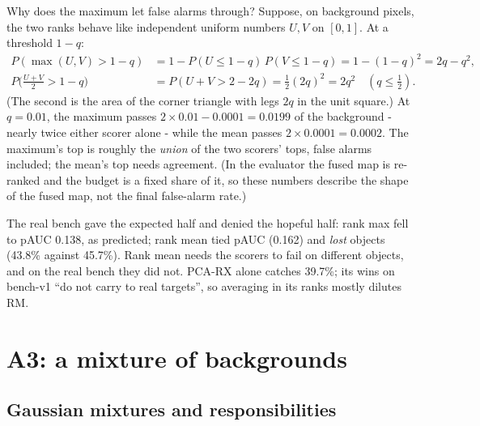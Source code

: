 Why does the maximum let false alarms through? Suppose, on background pixels, the two ranks behave like independent uniform
numbers $U, V$ on $[0, 1]$. At a threshold $1 - q$:
\begin{align*}
P(\max(U, V) > 1 - q) &= 1 - P(U \le 1 - q)\,P(V \le 1 - q) = 1 - (1 - q)^2 = 2q - q^2,\\
P\big(\tfrac{U + V}{2} > 1 - q\big) &= P(U + V > 2 - 2q) = \tfrac12 (2q)^2 = 2q^2 \quad (q \le \tfrac12).
\end{align*}
(The second is the area of the corner triangle with legs $2q$ in the unit square.) At $q = 0.01$, the maximum passes $2
\times 0.01 - 0.0001 = 0.0199$ of the background - nearly twice either scorer alone - while the mean passes $2 \times 0.0001
= 0.0002$. The maximum's top is roughly the \emph{union} of the two scorers' tops, false alarms included; the mean's top
needs agreement. (In the evaluator the fused map is re-ranked and the budget is a fixed share of it, so these numbers
describe the shape of the fused map, not the final false-alarm rate.)

The real bench gave the expected half and denied the hopeful half: rank max fell to pAUC 0.138, as predicted; rank mean tied
pAUC (0.162) and \emph{lost} objects (43.8\% against 45.7\%). Rank mean needs the scorers to fail on different objects, and
on the real bench they did not. PCA-RX alone catches 39.7\%; its wins on bench-v1 ``do not carry to real targets'', so
averaging in its ranks mostly dilutes RM.

\section{A3: a mixture of backgrounds}\label{sec:scoringgains:a3}

\subsection{Gaussian mixtures and responsibilities}

